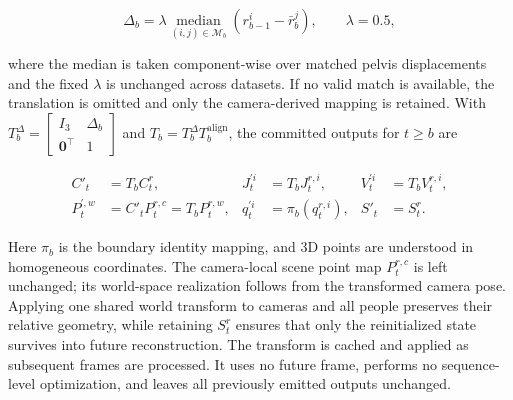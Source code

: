 \begin{equation}
 \Delta_b=\lambda\underset{(i,j)\in\mathcal M_b}{\operatorname{median}}
 (r_{b-1}^i-\bar r_b^j),\qquad \lambda=0.5,
 \label{eq:shared-translation}
\end{equation}

where the median is taken component-wise over matched pelvis displacements and
the fixed $\lambda$ is unchanged across datasets. If no valid match is
available, the translation is omitted and only the camera-derived mapping is
retained. With
$T_b^\Delta=\begin{bmatrix}I_3&\Delta_b\\\mathbf 0^\top&1\end{bmatrix}$ and
$T_b=T_b^\Delta T_b^{\mathrm{align}}$, the committed outputs for $t\geq b$ are

\begin{equation}
\begin{aligned}
 C'_t&=T_bC_t^r, &
 J_t^{\prime i}&=T_bJ_t^{r,i}, &
 V_t^{\prime i}&=T_bV_t^{r,i},\\
 P_t^{\prime,w}&=C'_tP_t^{r,c}=T_bP_t^{r,w}, &
 q_t^{\prime i}&=\pi_b(q_t^{r,i}), &
 S'_t&=S_t^r.
\end{aligned}
\label{eq:shared-world-transform}
\end{equation}

Here $\pi_b$ is the boundary identity mapping, and 3D points are understood in
homogeneous coordinates. The camera-local scene point map $P_t^{r,c}$ is left
unchanged; its world-space realization follows from the transformed camera
pose. Applying one shared world transform to cameras and all people preserves
their relative geometry, while retaining $S_t^r$ ensures that only the
reinitialized state survives into future reconstruction. The transform is
cached and applied as subsequent frames are processed. It uses no future
frame, performs no sequence-level optimization, and leaves all previously
emitted outputs unchanged.
